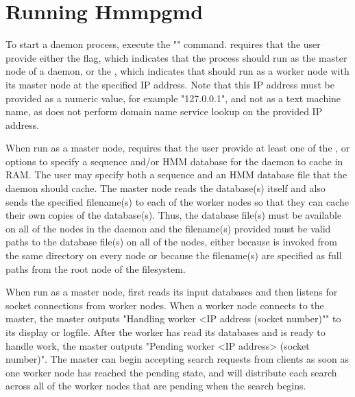 \documentclass[notoc,justified]{tufte-book}    %
\begin{document}
\section{Running Hmmpgmd}
To start a daemon process, execute the "" command.   requires that the user provide either the  flag, which indicates that the process should run as the master node of a daemon, or the , which indicates that  should run as a worker node with its master node at the specified IP address.  Note that this IP address must be provided as a numeric value, for example "127.0.0.1", and not as a text machine name, as  does not perform domain name service lookup on the provided IP address.  

When run as a master node,  requires that the user provide at least one of the , or  options to specify a sequence and/or HMM database for the daemon to cache in RAM.  The user may specify both a sequence and an HMM database file that the daemon should cache.  The master node reads the database(s) itself and also sends the specified filename(s) to each of the worker nodes so that they can cache their own copies of the database(s).  Thus, the database file(s) must be available on all of the nodes in the daemon and the filename(s) provided must be valid paths to the database file(s) on all of the nodes, either because  is invoked from the same directory on every node or because the filename(s) are specified as full paths from the root node of the filesystem.

When run as a master node,  first reads its input databases and then listens for socket connections from worker nodes.  When a worker node connects to the master, the master outputs  "Handling worker <IP address (socket number)"" to its display or logfile.  After the worker has read its databases and is ready to handle work, the master outputs "Pending worker <IP address> (socket number)".  The master can begin accepting search requests from clients as soon as one worker node has reached the pending state, and will distribute each search across all of the worker nodes that are pending when the search begins.
\end{document}
